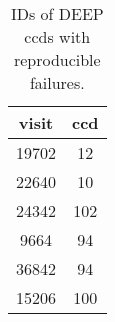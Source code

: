 \begin{table}[ht]
\centering
\begin{tabular} {|c|c|}
\hline
visit & ccd \\
\hline
19702 & 12 \\
22640 & 10 \\
24342 & 102 \\
9664  & 94 \\
36842 & 94 \\
15206 & 100 \\
\hline
\end{tabular}
\caption{IDs of DEEP ccds with reproducible failures.}
\label{DEEPFailsTable}
\end{table}
